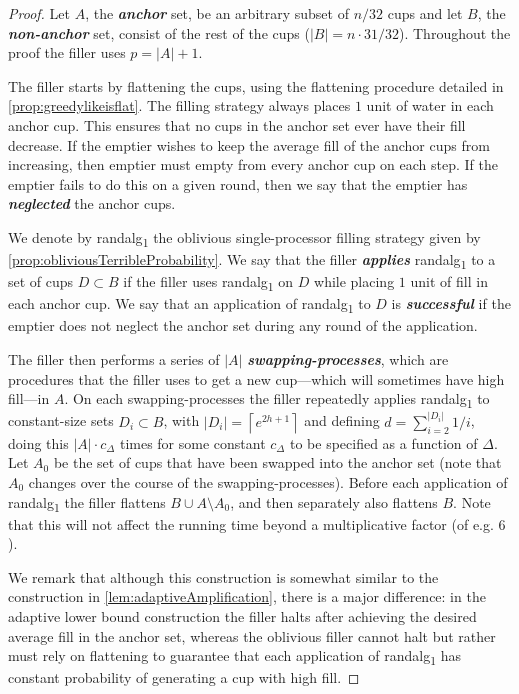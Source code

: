 \documentclass[twocolumn]{article}[10pt]
\newcommand{\defn}[1]{{\textit{\textbf{\boldmath #1}}}\xspace}
\newcommand{\randalg}{randalg\textsubscript{1}\xspace}
\newcommand{\ceil}[1]{\left\lceil #1 \right\rceil}
\begin{document}
\begin{proof}
Let $A$, the \defn{anchor} set, be an arbitrary subset of
$n/32$ cups and let $B$, the \defn{non-anchor} set, consist of
the rest of the cups ($|B| = n\cdot 31/32$). 
Throughout the proof the filler uses $p=|A|+1$.

The filler starts by flattening the cups, using the flattening procedure
detailed in \cref{prop:greedylikeisflat}. 
The filling strategy always places $1$ unit of water in each
anchor cup. This ensures that no cups in the anchor set ever
have their fill decrease. If the emptier wishes to keep the
average fill of the anchor cups from increasing, then emptier
must empty from every anchor cup on each step. If the emptier
fails to do this on a given round, then we say that the emptier
has \defn{neglected} the anchor cups. 

We denote by \randalg the oblivious single-processor filling
strategy given by \cref{prop:obliviousTerribleProbability}. We
say that the filler \defn{applies} \randalg to a set of cups $D
\subset B$ if the filler uses \randalg on $D$ while placing $1$
unit of fill in each anchor cup. We say that an application of
\randalg to $D$ is \defn{successful} if the emptier does not
neglect the anchor set during any round of the application.

The filler then performs a series of $|A|$
\defn{swapping-processes}, which are procedures that the filler
uses to get a new cup---which will sometimes have high fill---in
$A$. On each swapping-processes the filler repeatedly applies \randalg to
constant-size sets $D_i \subset B$, with $|D_i| =
\ceil{e^{2h+1}}$ and defining $d = \sum_{i=2}^{|D_i|} 1/i$, doing this $|A|\cdot c_\Delta$ times
for some constant $c_\Delta$ to be specified as a function of
$\Delta$. Let $A_0$ be the set of cups that have been swapped into the
anchor set (note that $A_0$ changes over the course of the
swapping-processes). Before each application of \randalg the filler
flattens $B \cup A\setminus A_0$, and then separately also
flattens $B$. Note that this will not affect the running time
beyond a multiplicative factor (of e.g. $6$). 

We remark that although this construction is somewhat similar to
the construction in \cref{lem:adaptiveAmplification}, there is a
major difference: in the adaptive lower bound construction the
filler halts after achieving the desired average fill in the
anchor set, whereas the oblivious filler cannot halt but rather
must rely on flattening to guarantee that each application of
\randalg has constant probability of generating a cup with high
fill.


\end{proof}
\end{document}
